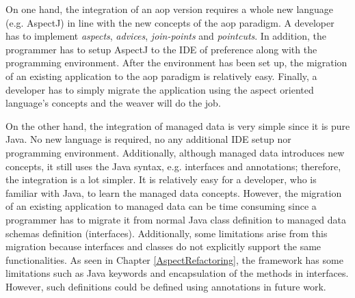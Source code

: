 On one hand, the integration of an \ac{aop} version requires a whole new language (e.g. AspectJ) in line with the new concepts of the \ac{aop} paradigm.
A developer has to implement \textit{aspects}, \textit{advices}, \textit{join-points} and \textit{pointcuts}. 
In addition, the programmer has to setup AspectJ to the IDE of preference along with the programming environment.
After the environment has been set up, the migration of an existing application to the \ac{aop} paradigm is relatively easy.
Finally, a developer has to simply migrate the application using the aspect oriented language's concepts and the weaver will do the job.

On the other hand, the integration of managed data is very simple since it is pure Java.
No new language is required, no any additional IDE setup nor programming environment.
Additionally, although managed data introduces new concepts, it still uses the Java syntax, e.g. interfaces and annotations; therefore, the integration is a lot simpler.
It is relatively easy for a developer, who is familiar with Java, to learn the managed data concepts.
However, the migration of an existing application to managed data can be time consuming since a programmer has to migrate it from normal Java class definition  to managed data schemas definition (interfaces).
Additionally, some limitations arise from this migration because interfaces and classes do not explicitly support the same functionalities.
As seen in Chapter \ref{AspectRefactoring}, the framework has some limitations such as Java keywords and encapsulation of the methods in interfaces.
However, such definitions could be defined using annotations in future work.


